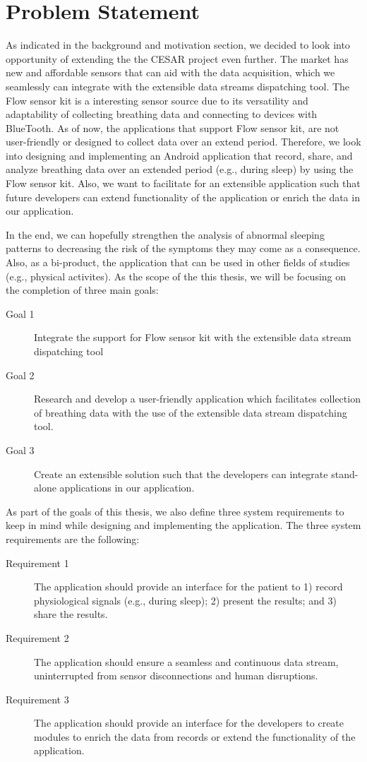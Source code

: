 \section{Problem Statement}

As indicated in the background and motivation section, we decided to look into opportunity of extending the the CESAR project even further. The market has new and affordable sensors that can aid with the data acquisition, which we seamlessly can integrate with the extensible data streams dispatching tool. The Flow sensor kit is a interesting sensor source due to its versatility and adaptability of collecting breathing data and connecting to devices with BlueTooth. As of now, the applications that support Flow sensor kit, are not user-friendly or designed to collect data over an extend period. Therefore, we look into designing and implementing an Android application that record, share, and analyze breathing data over an extended period (e.g., during sleep) by using the Flow sensor kit. Also, we want to facilitate for an extensible application such that future developers can extend functionality of the application or enrich the data in our application. 

In the end, we can hopefully strengthen the analysis of abnormal sleeping patterns to decreasing the risk of the symptoms they may come as a consequence. Also, as a bi-product, the application that can be used in other fields of studies (e.g., physical activites). As the scope of the this thesis, we will be focusing on the completion of three main goals:

\begin{description}
    \item[Goal 1] Integrate the support for Flow sensor kit with the extensible data stream dispatching tool
    \item[Goal 2] Research and develop a user-friendly application which facilitates collection of breathing data with the use of the extensible data stream dispatching tool.
    \item[Goal 3] Create an extensible solution such that the developers can integrate stand-alone applications in our application. 
\end{description}

As part of the goals of this thesis, we also define three system requirements to keep in mind while designing and implementing the application. The three system requirements are the following: 

\begin{description}
    \item[Requirement 1] The application should provide an interface for the patient to 1) record physiological signals (e.g., during sleep); 2) present the results; and 3) share the results.
    \item[Requirement 2] The application should ensure a seamless and continuous data stream, uninterrupted from sensor disconnections and human disruptions.
    \item[Requirement 3] The application should provide an interface for the developers to create modules to enrich the data from records or extend the functionality of the application.
\end{description}

